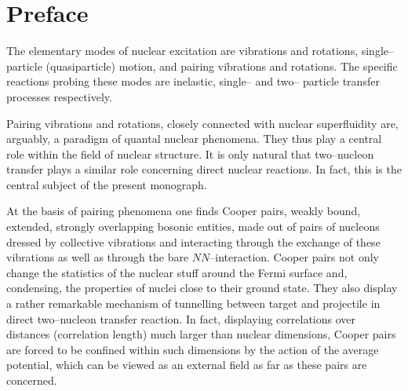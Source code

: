 \documentclass[a4paper,14pt]{book}
\begin{document}
 \chapter{Preface}
The elementary modes of nuclear excitation are vibrations and rotations, single--particle (quasiparticle)  motion, and pairing vibrations and rotations. The specific reactions probing these modes are inelastic,  single-- and two-- particle transfer processes respectively.

Pairing vibrations and rotations, closely connected with nuclear superfluidity are, arguably, a paradigm of quantal nuclear phenomena. They thus play a central role within the field of nuclear structure. It is only natural that two--nucleon transfer plays a similar role concerning direct nuclear reactions. In fact, this is the central subject of the present monograph.


At the basis of pairing phenomena one finds Cooper pairs, weakly bound, extended, strongly overlapping bosonic entities, made out of pairs of nucleons dressed by collective vibrations and interacting through the exchange of these vibrations as well as through the bare $NN$--interaction.
Cooper pairs not only change the statistics of the nuclear stuff around the Fermi surface and, condensing, the properties of nuclei close to their ground state. They also display a rather remarkable mechanism of tunnelling between  target and projectile in  direct two--nucleon transfer reaction. In fact, displaying correlations over distances (correlation length) much larger than nuclear dimensions, Cooper pairs are forced to be confined within such dimensions by the action of the average potential, which can be viewed as an external field as far as these pairs are concerned.
\end{document}
